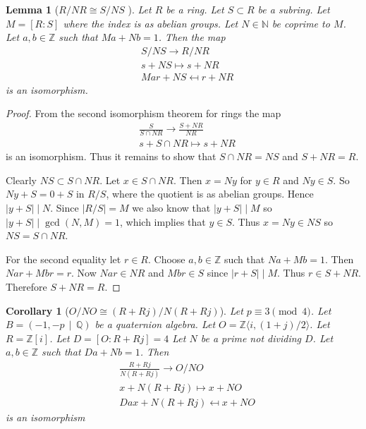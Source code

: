 \documentclass[10pt]{article}
\theoremstyle{plain}
\newtheorem{lemma}[theorem]{Lemma}
\newtheorem{corollary}[theorem]{Corollary}
\theoremstyle{definition}
\newcommand{\iso}{\cong}
\newcommand{\N}{\mathbb{N}}
\newcommand{\Z}{\mathbb{Z}}
\newcommand{\Q}{\mathbb{Q}}
\begin{document}
\begin{lemma}[\( R/ NR \iso S / NS \) ]
    Let \( R \) be a ring.
    Let \( S \subset R \) be a subring.
    Let \( M = [R : S] \) where the index is as abelian groups.
    Let \( N \in \N \) be coprime to \( M \).
    Let \( a, b \in \Z \) such that \( Ma + Nb = 1 \).
    Then the map
    \begin{align*}
          & S / NS \to R / NR         \\
          & s + NS \mapsto s + NR     \\
          & Mar + NS \mapsfrom r + NR
    \end{align*}
    is an isomorphism.
\end{lemma}
\begin{proof}
    From the second isomorphism theorem for rings the map
    \begin{align*}
          & \frac{S}{S \cap NR} \to \frac{S + NR}{NR} \\
          & s + S \cap NR \mapsto s + NR
    \end{align*}
    is an isomorphism.
    Thus it remains to show that \( S \cap NR = NS \) and \( S + NR = R \).

    Clearly \( NS \subset S \cap NR \).
    Let \( x \in S \cap NR \).
    Then \( x = Ny \) for \( y \in R \) and \( Ny \in S \).
    So \( Ny + S = 0 + S \) in \( R / S \), where the quotient is as abelian groups.
    Hence \( |y + S| \mid N \).
    Since \( |R / S| = M \) we also know that \( |y + S| \mid M \) so \( |y + S| \mid \gcd(N, M) = 1 \), which implies that \( y \in S \).
    Thus \( x = Ny \in NS \) so \( NS = S \cap NR \).

    For the second equality let \( r \in R \).
    Choose \( a, b \in \Z \) such that \( Na + Mb = 1 \).
    Then \( Nar + Mbr = r \).
    Now \( Nar \in NR \) and \( Mbr \in S \) since \( |r + S| \mid M \).
    Thus \( r \in S + NR \).
    Therefore \( S + NR = R \).
\end{proof}

\begin{corollary}[\( O / NO \iso (R + Rj) / N(R + Rj)\)]
    Let \( p \equiv 3 \pmod{4} \).
    Let \( B =  (-1, -p \, \mid \, \Q) \) be a quaternion algebra.
    Let \( O = \Z \langle i, (1+j) / 2 \rangle \).
    Let \( R = \Z[i] \).
    Let \( D =  [O : R + Rj] = 4\)
    Let \( N \) be a prime not dividing \( D \).
    Let \( a, b \in \Z \) such that \( Da + Nb = 1 \).
    Then
    \begin{align*}
          & \frac{R + Rj}{N(R + Rj)} \to O / NO \\
          & x + N(R + Rj)\mapsto x + NO         \\
          & Dax + N(R + Rj) \mapsfrom x + NO
    \end{align*}
    is an isomorphism
\end{corollary}
\end{document}
